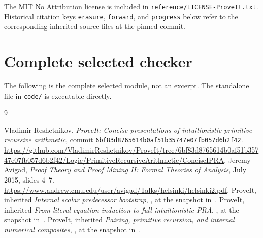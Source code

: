 \documentclass[11pt,a4paper]{article}
\theoremstyle{definition}
\begin{document}
The MIT No Attribution license is included in
\texttt{reference/LICENSE-ProveIt.txt}. Historical citation keys
\texttt{erasure}, \texttt{forward}, and \texttt{progress} below refer
to the corresponding inherited source files at the pinned commit.







\clearpage
\section{Complete selected checker}
The following is the complete selected module, not an excerpt.
The standalone file in \texttt{code/} is executable directly.


\begin{thebibliography}{9}\raggedright
{}
Vladimir Reshetnikov, \emph{ProveIt: Concise presentations of intuitionistic
primitive recursive arithmetic}, commit
\texttt{6bf83d8765614b0af51b35747e07fb057d6b2f42}.
\url{https://github.com/VladimirReshetnikov/ProveIt/tree/6bf83d8765614b0af51b35747e07fb057d6b2f42/Logic/PrimitiveRecursiveArithmetic/ConciseIPRA}.
Jeremy Avigad, \emph{Proof Theory and Proof Mining II: Formal Theories
of Analysis}, July 2015, slides 4--7.
\url{https://www.andrew.cmu.edu/user/avigad/Talks/helsinki/helsinki2.pdf}.
ProveIt, inherited \emph{Internal scalar predecessor bootstrap},
,
at the snapshot in~\cite{upstream}.
ProveIt, inherited \emph{From literal-equation induction to full
intuitionistic PRA},
,
at the snapshot in~\cite{upstream}.
ProveIt, inherited \emph{Pairing, primitive recursion, and internal
numerical composites},
,
at the snapshot in~\cite{upstream}.
\end{thebibliography}
\end{document}
